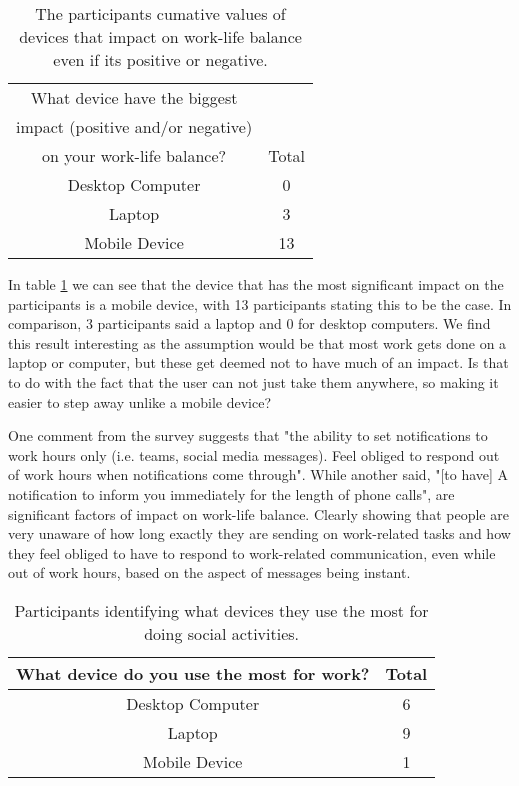 \documentclass{sigchi}
\begin{document}
	
	\begin{table}[ht]
		\centering
		\small
		\begin{tabular}[t]{ |c| c | }
			\hline
			What device have the biggest & \\
			impact (positive and/or negative) & \\
			on your work-life balance?  & Total  \\ 
			\hline
			Desktop Computer & 0 \\ 
			\hline
			Laptop & 3  \\ 
			\hline
			Mobile Device &  13 \\
			\hline
			
		\end{tabular}
		\caption{The participants cumative values of devices that impact on work-life balance even if its positive or negative.}
		\label{tab:device_impact}
	\end{table}%

	
	In table \ref{tab:device_impact} we can see that the device that has the most significant impact on the participants is a mobile device, with 13 participants stating this to be the case. In comparison, 3 participants said a laptop and 0 for desktop computers. We find this result interesting as the assumption would be that most work gets done on a laptop or computer, but these get deemed not to have much of an impact. Is that to do with the fact that the user can not just take them anywhere, so making it easier to step away unlike a mobile device?
	
	One comment from the survey suggests that "the ability to set notifications to work hours only (i.e. teams, social media messages). Feel obliged to respond out of work hours when notifications come through". While another said, "[to have] A notification to inform you immediately for the length of phone calls", are significant factors of impact on work-life balance. Clearly showing that people are very unaware of how long exactly they are sending on work-related tasks and how they feel obliged to have to respond to work-related communication, even while out of work hours, based on the aspect of messages being instant.
	
	
	\begin{table}[ht]
		\centering
		\small
		\begin{tabular}[t]{ |c| c | }
			\hline
			What device do you use the most for work? & Total  \\ 
			\hline
			Desktop Computer & 6 \\ 
			\hline
			Laptop & 9  \\ 
			\hline
			Mobile Device &  1 \\
			\hline
		\end{tabular}
		\caption{Participants identifying what devices they use the most for doing social activities.}
		\label{tab:device_work}
	\end{table}%
	
\end{document}
